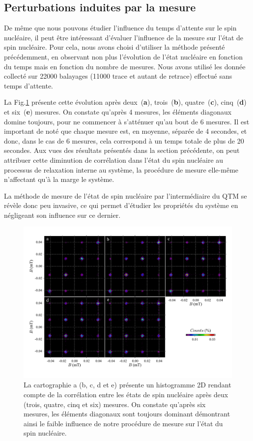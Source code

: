 \subsection{Perturbations induites par la mesure}
De m\^eme que nous pouvons étudier l'influence du temps d'attente sur le spin nucléaire, il peut \^etre intéressant d'évaluer l'influence de la mesure sur l'état de spin nucléaire. Pour cela, nous avons choisi d'utiliser la méthode présenté précédemment, en observant non plus l'évolution de l'état nucléaire en fonction du temps mais en fonction du nombre de mesures. Nous avons utilisé les donnée collecté sur 22000 balayages (11000 trace et autant de retrace) effectué sans temps d'attente.

La Fig.\ref{evolution_mesures} présente cette évolution après deux~(\textbf{a}), trois~(\textbf{b}), quatre~(\textbf{c}), cinq~(\textbf{d}) et six~(\textbf{e}) mesures. On constate qu'après 4 mesures, les éléments diagonaux domine toujours, pour ne commencer à s'atténuer qu'au bout de 6 mesures. Il est important de noté que chaque mesure est, en moyenne, séparée de 4 secondes, et donc, dans le cas de 6 mesures, cela correspond à un temps totale de plus de 20 secondes. Aux vues des résultats présentés dans la section précédente, on peut attribuer cette diminution de corrélation dans l'état du spin nucléaire au processus de relaxation interne au système, la procédure de mesure elle-même n'affectant qu'à la marge le système. 

La méthode de mesure de l'état de spin nucléaire par l'intermédiaire du QTM se révèle donc peu invasive, ce qui permet d'étudier les propriétés du système en négligeant son influence sur ce dernier.

\begin{figure}
\includegraphics[scale=0.45]{Resultats/MesureInfl/MesureInfl.pdf} 
\caption{La cartographie a (b, c, d et e) présente un histogramme 2D rendant compte de la corrélation entre les états de spin nucléaire après deux (trois, quatre, cinq et six) mesures. On constate qu'après six mesures, les éléments diagonaux sont toujours dominant démontrant ainsi le faible influence de notre procédure de mesure sur l'état du spin nucléaire.}
\label{evolution_mesures}
\end{figure}

